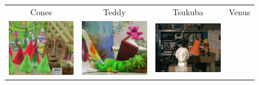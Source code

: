\documentclass{article}
\begin{document}
\begin{figure}[h]
\begin{center}	
\begin{tabular}{cccc}
Cones & Teddy & Tsukuba & Venus\\
\includegraphics[scale=0.23]{Images/cones.png} &
\includegraphics[scale=0.23]{Images/teddy.png} &
\includegraphics[scale=0.298]{Images/tsukuba.png} &

\end{tabular}
\end{center}
\end{figure}
\end{document}

